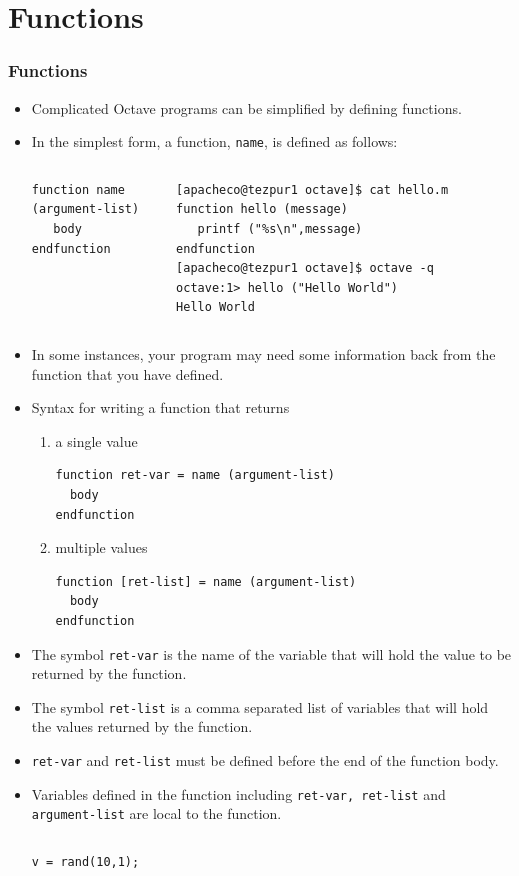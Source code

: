 \documentclass[t,compress,xcolor=svgnames]{beamer}
\begin{document}
\section{Functions}
\begin{frame}
  \frametitle{\small Functions}
  \begin{itemize}
    \item Complicated Octave programs can be simplified by defining functions.
    \item In the simplest form, a function, \texttt{name}, is defined as follows:
   {\tiny
     \begin{columns}
       \column{4cm}
       \begin{verbatim}
function name (argument-list)
   body
endfunction
       \end{verbatim}
       \column{4cm}
       \begin{verbatim}
[apacheco@tezpur1 octave]$ cat hello.m 
function hello (message)
   printf ("%s\n",message)                                                     
endfunction
[apacheco@tezpur1 octave]$ octave -q
octave:1> hello ("Hello World")
Hello World
       \end{verbatim}
     \end{columns}
   }
   \item In some instances, your program may need some information back from the function that you have defined.
   \item Syntax for writing a function that returns
   \begin{enumerate}
     \item a single value
     {\tiny
       \begin{verbatim}
function ret-var = name (argument-list)
  body
endfunction
       \end{verbatim}
     }
     \item multiple values
       {\tiny
       \begin{verbatim}
function [ret-list] = name (argument-list)
  body
endfunction
       \end{verbatim}
       }
   \end{enumerate}
   \item The symbol \texttt{ret-var} is the name of the variable that will hold the value to be returned by the function.
   \item The symbol \texttt{ret-list} is a comma separated list of variables that will hold the values returned by the function.
   \item \texttt{ret-var} and \texttt{ret-list} must be defined before the end of the function body.
   \item Variables defined in the function including \texttt{ret-var, ret-list} and \texttt{argument-list} are local to the function.
   {\tiny
     \begin{columns}
       \column{4cm}
       \begin{verbatim}
v = rand(10,1);


\end{verbatim}
\end{columns}}
\end{itemize}
\end{frame}
\end{document}
